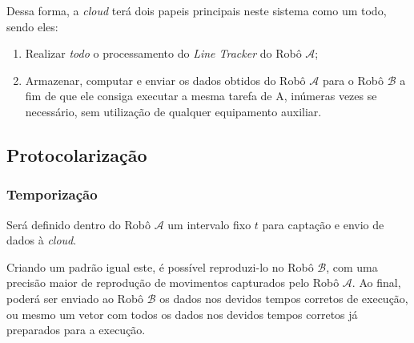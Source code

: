 \documentclass[portugues, brazil, a4paper,12pt]{article}
\begin{document}
		Dessa forma, a \textit{cloud} terá dois papeis principais neste sistema como um todo, sendo eles:

		\begin{enumerate}
			\item Realizar \textit{todo} o processamento do \textit{Line Tracker} do Robô $ \mathcal{A} $;
			\item Armazenar, computar e enviar os dados obtidos do Robô $ \mathcal{A} $ para o Robô $ \mathcal{B} $ a fim de que ele consiga executar a mesma tarefa  de A, inúmeras vezes se necessário, sem utilização de qualquer equipamento auxiliar.
		\end{enumerate}


	\subsection{Protocolarização}

		\subsubsection{Temporização}
			Será definido dentro do Robô $ \mathcal{A} $ um intervalo fixo $ t $ para captação e envio de dados à \textit{cloud}.

			Criando um padrão igual este, é possível reproduzi-lo no Robô $ \mathcal{B} $, com uma precisão maior de reprodução de movimentos capturados pelo Robô $ \mathcal{A} $. Ao final, poderá ser enviado ao Robô $ \mathcal{B} $ os dados nos devidos tempos corretos de execução, ou mesmo um vetor com todos os dados nos devidos tempos corretos já preparados para a execução.


%
\end{document}
